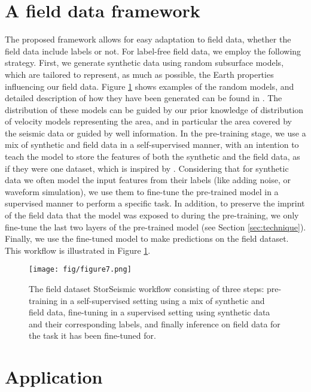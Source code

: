 \documentclass{article}
\begin{document}
\section{A field data framework}
\label{sec:data}
The proposed framework allows for easy adaptation to field data, whether the field data include labels or not. For label-free field data, we employ the following strategy. First, we generate synthetic data using random subsurface models, which are tailored to represent, as much as possible, the Earth properties influencing our field data. Figure \ref{fig:fig7} shows examples of the random models, and detailed description of how they have been generated can be found in \cite{ovcharenko2021data}. The distribution of these models can be guided by our prior knowledge of distribution of velocity models representing the area, and in particular the area covered by the seismic data or guided by well information. In the pre-training stage, we use a mix of synthetic and field data in a self-supervised manner, with an intention to teach the model to store the features of both the synthetic and the field data, as if they were one dataset, which is inspired by \cite{nowruzi2019much}. Considering that for synthetic data we often model the input features from their labels (like adding noise, or waveform simulation), we use them to fine-tune the pre-trained model in a supervised manner to perform a specific task. In addition, to preserve the imprint of the field data that the model was exposed to during the pre-training, we only fine-tune the last two layers of the pre-trained model (see Section \ref{sec:technique}). Finally, we use the fine-tuned model to make predictions on the field dataset. This workflow is illustrated in Figure \ref{fig:fig7}.

\begin{figure}[!h]
    \centering
    \texttt{[image: fig/figure7.png]}
    \caption{The field dataset StorSeismic workflow consisting of three steps: pre-training in a self-supervised setting using a mix of synthetic and field data, fine-tuning in a supervised setting using synthetic data and their corresponding labels, and finally inference on field data for the task it has been fine-tuned for.}
    \label{fig:fig7}
\end{figure}

\section{Application}
\label{sec:examples}
\end{document}
